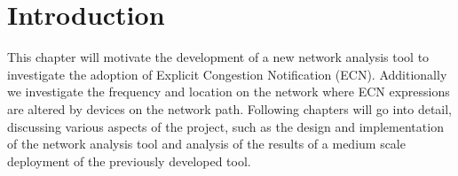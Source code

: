 \documentclass{l4proj}
\begin{document}
\educationalconsent


\tableofcontents

%
%
%
%
%
%
%


\chapter{Introduction}
\label{chap:introduction}


This chapter will motivate the development of a new network analysis tool to investigate the adoption of Explicit Congestion Notification (ECN). Additionally we investigate the frequency and location on the network where ECN expressions are altered by devices on the network path. Following chapters will go into detail, discussing various aspects of the project, such as the design and implementation of the network analysis tool and analysis of the results of a medium scale deployment of the previously developed tool.
\end{document}
